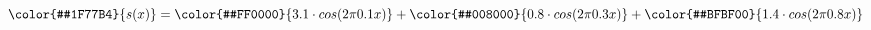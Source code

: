 $\color{#1F77B4}{s(x)} = \color{#FF0000}{3.1 \cdot cos(2\pi 0.1 x)} + \color{#008000}{0.8 \cdot cos(2\pi 0.3 x)} + \color{#BFBF00}{1.4 \cdot cos(2\pi 0.8 x)}$
